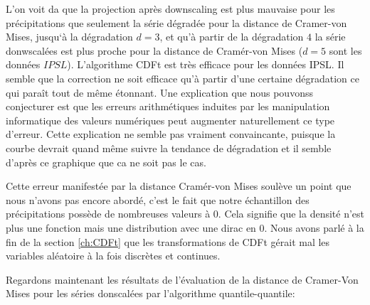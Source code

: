 \documentclass[a4paper,11pt]{article}
\numberwithin{equation}{section}
\begin{document}
L'on voit da que la projection après downscaling est plus mauvaise  pour les précipitations que seulement la série dégradée pour la distance de Cramer-von Mises, jusqu`à la dégradation $d=3$, et qu'à partir de la dégradation $4$ la série donwscalées est plus proche pour la distance de Cramér-von Mises ($d=5$ sont les données $IPSL$). L'algorithme CDFt est très efficace pour les données IPSL. Il semble que la correction ne soit efficace qu'à partir d'une certaine dégradation ce qui paraît tout de même étonnant. Une explication que nous pouvonss conjecturer est que les erreurs arithmétiques induites par les manipulation informatique des valeurs numériques peut augmenter naturellement ce type d'erreur. Cette explication ne semble pas vraiment convaincante, puisque la courbe devrait quand même suivre la tendance de dégradation et il semble d'après ce graphique que ca ne soit pas le cas.

Cette erreur manifestée par la distance Cramér-von Mises soulève un point que nous n'avons pas encore abordé, c'est le fait que notre échantillon des précipitations possède de nombreuses valeurs à $0$. Cela signifie que la densité n'est plus une fonction mais une distribution avec une dirac en $0$. Nous avons parlé à la fin de la section \ref{ch:CDFt} que les transformations de CDFt gérait mal les variables aléatoire à la fois discrètes et continues.

Regardons maintenant les résultats de l'évaluation de la distance de Cramer-Von Mises pour les séries donscalées par l'algorithme quantile-quantile:
\end{document}
